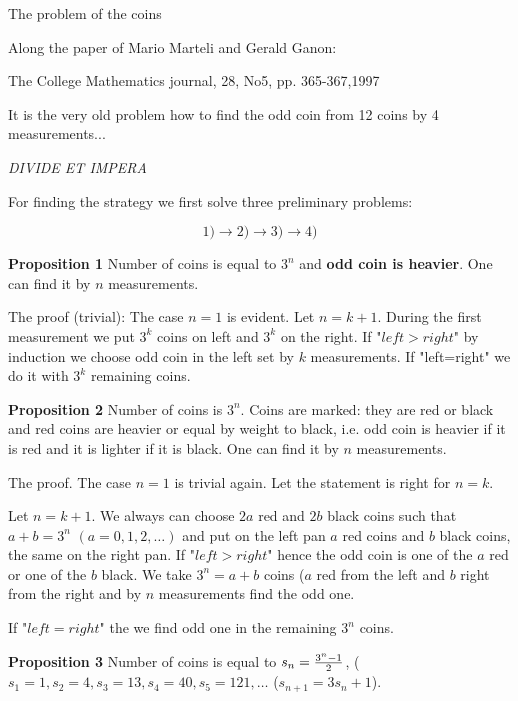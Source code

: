 
\centerline {The problem of the coins}

\bigskip
  \centerline {Along the paper of  Mario Marteli and Gerald Ganon:}


  \centerline {The College Mathematics journal, 28, No5, pp. 365-367,1997}



 It is the very old problem how to find the odd coin from 12 coins
 by 4 measurements...

    \bigskip


   \centerline {\it DIVIDE ET IMPERA}

      $$ $$
  For finding the strategy we first solve three preliminary
  problems:

       $$
       1)\rightarrow 2)\rightarrow 3)\rightarrow 4)
                    $$

  {\bf Proposition 1}
   Number of coins is equal to $3^n$ and {\bf odd coin is heavier}.
    One can find it by $n$ measurements.


    The proof (trivial): The case $n=1$ is evident. Let $n=k+1$. During the
    first measurement we put $3^k$ coins on left and $3^k$ on the
    right. If "$left > right$" by induction we choose odd coin in
    the left set by $k$ measurements. If "left=right" we do it
    with $3^k$ remaining coins.

       \bigskip

     {\bf Proposition 2}
      Number of coins is $3^n$. Coins are marked: they are red or black and
     red coins are heavier or equal by weight to black,
     i.e. odd coin is heavier if it is red and it is  lighter if it
     is black.
     One can find it by $n$ measurements.

     The proof. The case $n=1$ is trivial again.
   Let the statement is right for $n=k$.

      Let $n=k+1$.
     We always can choose $2a$ red and
    $2b$ black coins such that $a+b=3^n$ $(a=0,1,2,\dots)$ and put on the left
    pan $a$ red coins and $b$ black coins, the same on the
     right pan. If "$left> right$" hence the odd
  coin is one of the $a$ red or one of the $b$ black.
  We take $3^n=a+b$ coins ($a$ red from the left and $b$ right
  from the right and by $n$ measurements find the odd one.

    If "$left=right$" the we find odd one in the remaining $3^n$
    coins.

 \bigskip

   {\bf Proposition 3}
       Number of coins is equal to $s_n={3^n-1\over 2}$,
    ($s_1=1,s_2=4,s_3=13,s_4=40,s_5=121,\dots$ ($s_{n+1}=3s_n+1$).

